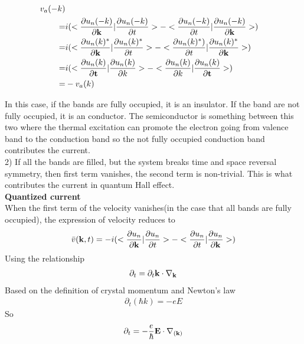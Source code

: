 \documentclass[a4paper]{article}
\begin{document}
\begin{align*}
	v_a(-k) \\
	= & i  (<\frac{\partial u_n(-k)}{\partial {\bf k}}| \frac{\partial u_n(-k)}{\partial t}> -<\frac{\partial u_n(-k)}{\partial t}| \frac{\partial u_n(-k)}{\partial {\bf k}}>) \\
	= & i  (<\frac{\partial u_n(k)^{*}}{\partial {\bf k}}| \frac{\partial u_n(k)^{*}}{\partial t}> -<\frac{\partial u_n(k)^{*})}{\partial t}| \frac{\partial u_n(k)^{*}}{\partial {\bf k}}>) \\
	= & i  (<\frac{\partial u_n(k)}{\partial {\bf t}}| \frac{\partial u_n(k)}{\partial k}> -<\frac{\partial u_n(k)}{\partial k}| \frac{\partial u_n(k)}{\partial {\bf t}}>) \\
    = & -v_a(k)
\end{align*}

In this case, if the bands are fully occupied, it is an insulator. If the band are not fully occupied, it is an conductor. The semiconductor is something between this two where the thermal excitation can promote the electron going from valence band to the conduction band so the not fully occupied conduction band contributes the current.\\
2) If all the bands are filled, but the system breaks time and space reversal symmetry, then first term vanishes, the second term is non-trivial. This is what contributes the current in quantum Hall effect.\\
{\bf Quantized current}\\
When the first term of the velocity vanishes(in the case that all bands are fully occupied), the expression of velocity reduces to
\begin{align}
	\bar v({\bf k},t) = - i  (<\frac{\partial u_n}{\partial {\bf k}}| \frac{\partial u_n}{\partial t}> -<\frac{\partial u_n}{\partial t}| \frac{\partial u_n}{\partial {\bf k}}>)
\end{align}
Using the relationship 
\begin{align*}
	\partial_t = \partial_t {\bf k} \cdot \nabla_{\bf k} 
\end{align*}
Based on the definition of crystal momentum and Newton's law
\begin{align*}
	\partial_t(\hbar k) = -eE
\end{align*}
So
\begin{align*}
	\partial_t = -\frac{e}{\hbar} {\bf E} \cdot \nabla_{({\bf k})}
\end{align*}
\end{document}
